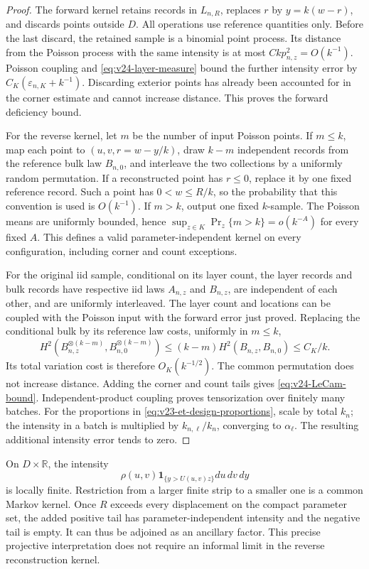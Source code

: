 \begin{proof}
The forward kernel retains records in \(L_{n,R}\), replaces \(r\) by
\(y=k(w-r)\), and discards points outside \(D\).  All operations use
reference quantities only.  Before the last discard, the retained sample
is a binomial point process.  Its distance from the Poisson process with
the same intensity is at most \(Ckp_{n,z}^2=O(k^{-1})\).  Poisson coupling
and \eqref{eq:v24-layer-measure} bound the further intensity error by
\(C_K(\varepsilon_{n,K}+k^{-1})\).  Discarding exterior points has already
been accounted for in the corner estimate and cannot increase distance.
This proves the forward deficiency bound.

For the reverse kernel, let \(m\) be the number of input Poisson points.
If \(m\le k\), map each point to \((u,v,r=w-y/k)\), draw \(k-m\)
independent records from the reference bulk law \(B_{n,0}\), and interleave
the two collections by a uniformly random permutation.  If a reconstructed
point has \(r\le0\), replace it by one fixed reference record.  Such a
point has \(0<w\le R/k\), so the probability that this convention is
used is \(O(k^{-1})\).  If \(m>k\), output one fixed \(k\)-sample.
The Poisson means are uniformly bounded, hence
\(\sup_{z\in K}\Pr_z\{m>k\}=o(k^{-A})\) for every fixed \(A\).
This defines a valid parameter-independent kernel on every configuration,
including corner and count exceptions.

For the original iid sample, conditional on its layer count, the layer
records and bulk records have respective iid laws \(A_{n,z}\) and
\(B_{n,z}\), are independent of each other, and are uniformly interleaved.
The layer count and locations can be coupled with the Poisson input with
the forward error just proved.  Replacing the conditional bulk by its
reference law costs, uniformly in \(m\le k\),
\[
 H^2(B_{n,z}^{\otimes(k-m)},B_{n,0}^{\otimes(k-m)})
       \le(k-m)H^2(B_{n,z},B_{n,0})\le C_K/k.
\]
Its total variation cost is therefore \(O_K(k^{-1/2})\).  The common
permutation does not increase distance.  Adding the corner and count tails
gives \eqref{eq:v24-LeCam-bound}.  Independent-product coupling proves
tensorization over finitely many batches.  For the proportions in
\eqref{eq:v23-et-design-proportions}, scale by total \(k_n\); the intensity
in a batch is multiplied by \(k_{n,\ell}/k_n\), converging to
\(\alpha_\ell\).  The resulting additional intensity error tends to zero.
\end{proof}

\begin{remark}
\label{rem:v24-projective-poisson}
On \(D\times\mathbb R\), the intensity
\[
 \rho(u,v)\mathbf1_{\{y>U(u,v)z\}}du\,dv\,dy
\]
is locally finite.
Restriction from a larger finite strip to a smaller one is a common Markov
kernel.  Once \(R\) exceeds every displacement on the compact parameter
set, the added positive tail has parameter-independent intensity and the
negative tail is empty.  It can thus be adjoined as an ancillary factor.
This precise projective interpretation does not require an informal limit
in the reverse reconstruction kernel.
\end{remark}
